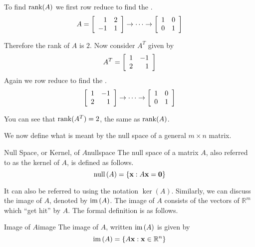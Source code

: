 \begin{solution}
To find $\mbox{rank}(A)$ we first row reduce to find the {\rref}.
\[
A = 
\left[
\begin{array}{rr}
1 & 2 \\
-1 & 1 
\end{array} \right]
\rightarrow \cdots \rightarrow
\left[ \begin{array}{rr}
1 & 0 \\
0 & 1 
\end{array}\right]
\]

Therefore the rank of $A$ is $2$. Now consider $A^T$ given by 
\[
A^T = \left[ \begin{array}{rr}
1 & -1 \\
2 & 1 
\end{array} \right]
\]
Again we row reduce to find the {\rref}.
\[
\left[ \begin{array}{rr}
1 & -1 \\
2 & 1 
\end{array} \right]
\rightarrow \cdots \rightarrow
\left[ \begin{array}{rr}
1 & 0 \\
0 & 1 
\end{array} \right]
\]

You can see that $\mbox{rank}(A^T) = 2$, the same as $\mbox{rank}(A)$. 
\end{solution}

We now define what is meant by the null space of a general $m\times n$ matrix.

\begin{definition}{Null Space, or Kernel, of $A$}{nullspace}
The null space of a matrix $A$, also referred to as the kernel of $A$, 
is defined as follows.%
\begin{equation*}
\mbox{null} \left( A\right) =\left\{ {\bf x} :A {\bf x} ={\bf 0}\right\}
\end{equation*}
\end{definition}

It can also be referred to using the notation $\ker \left(
A\right) $. 
Similarly, we can discuss the image of $A$, denoted by
$\mbox{im}\left( A\right)$. The image of $A$ consists of the vectors
of $\mathbb{R}^{m}$ which ``get hit'' by $A$.  The formal definition
is as follows.

\begin{definition}{Image of $A$}{image}
The image of $A$, written $\mbox{im}\left( A\right)$ is given by
\[
\mbox{im}\left( A \right) = \left\{ A{\bf x} : {\bf x} \in \mathbb{R}^n \right\}
\]
\end{definition}

